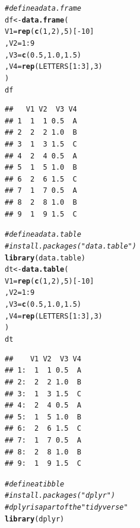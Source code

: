 \documentclass[11pt]{article}\usepackage[]{graphicx}\usepackage[]{color}
\makeatletter
\newcommand{\hlnum}[1]{\textcolor[rgb]{0.686,0.059,0.569}{#1}}%
\newcommand{\hlcom}[1]{\textcolor[rgb]{0.678,0.584,0.686}{\textit{#1}}}%
\newcommand{\hlopt}[1]{\textcolor[rgb]{0,0,0}{#1}}%
\newcommand{\hlstd}[1]{\textcolor[rgb]{0.345,0.345,0.345}{#1}}%
\newcommand{\hlkwb}[1]{\textcolor[rgb]{0.69,0.353,0.396}{#1}}%
\newcommand{\hlkwc}[1]{\textcolor[rgb]{0.333,0.667,0.333}{#1}}%
\newcommand{\hlkwd}[1]{\textcolor[rgb]{0.737,0.353,0.396}{\textbf{#1}}}%
\newenvironment{kframe}{%
 \def\at@end@of@kframe{}%
 \ifinner\ifhmode%
  \def\at@end@of@kframe{\end{minipage}}%
  \begin{minipage}{\columnwidth}%
 \fi\fi%
 \def\FrameCommand##1{\hskip\@totalleftmargin \hskip-\fboxsep
 \colorbox{shadecolor}{##1}\hskip-\fboxsep
     \hskip-\linewidth \hskip-\@totalleftmargin \hskip\columnwidth}%
 \MakeFramed {\advance\hsize-\width
   \@totalleftmargin\z@ \linewidth\hsize
   \@setminipage}}%
 {\par\unskip\endMakeFramed%
 \at@end@of@kframe}
\newenvironment{knitrout}{}{} %
\makeatother
\begin{document}
\begin{knitrout}
\color{fgcolor}\begin{kframe}
\begin{alltt}
\hlcom{# define a data.frame}
\hlstd{df} \hlkwb{<-} \hlkwd{data.frame}\hlstd{(}
          \hlkwc{V1} \hlstd{=} \hlkwd{rep}\hlstd{(}\hlkwd{c}\hlstd{(}\hlnum{1}\hlstd{,} \hlnum{2}\hlstd{),} \hlnum{5}\hlstd{)[}\hlopt{-}\hlnum{10}\hlstd{]}
        \hlstd{,} \hlkwc{V2} \hlstd{=} \hlnum{1}\hlopt{:}\hlnum{9}
        \hlstd{,} \hlkwc{V3} \hlstd{=} \hlkwd{c}\hlstd{(}\hlnum{0.5}\hlstd{,} \hlnum{1.0}\hlstd{,} \hlnum{1.5}\hlstd{)}
        \hlstd{,} \hlkwc{V4} \hlstd{=} \hlkwd{rep}\hlstd{(LETTERS[}\hlnum{1}\hlopt{:}\hlnum{3}\hlstd{],} \hlnum{3}\hlstd{)}
        \hlstd{)}
\hlstd{df}
\end{alltt}
\begin{verbatim}
##   V1 V2  V3 V4
## 1  1  1 0.5  A
## 2  2  2 1.0  B
## 3  1  3 1.5  C
## 4  2  4 0.5  A
## 5  1  5 1.0  B
## 6  2  6 1.5  C
## 7  1  7 0.5  A
## 8  2  8 1.0  B
## 9  1  9 1.5  C
\end{verbatim}
\begin{alltt}
\hlcom{# define a data.table}
\hlcom{# install.packages("data.table")}
\hlkwd{library}\hlstd{(data.table)}
\hlstd{dt} \hlkwb{<-} \hlkwd{data.table}\hlstd{(}
          \hlkwc{V1} \hlstd{=} \hlkwd{rep}\hlstd{(}\hlkwd{c}\hlstd{(}\hlnum{1}\hlstd{,} \hlnum{2}\hlstd{),} \hlnum{5}\hlstd{)[}\hlopt{-}\hlnum{10}\hlstd{]}
        \hlstd{,} \hlkwc{V2} \hlstd{=} \hlnum{1}\hlopt{:}\hlnum{9}
        \hlstd{,} \hlkwc{V3} \hlstd{=} \hlkwd{c}\hlstd{(}\hlnum{0.5}\hlstd{,} \hlnum{1.0}\hlstd{,} \hlnum{1.5}\hlstd{)}
        \hlstd{,} \hlkwc{V4} \hlstd{=} \hlkwd{rep}\hlstd{(LETTERS[}\hlnum{1}\hlopt{:}\hlnum{3}\hlstd{],} \hlnum{3}\hlstd{)}
        \hlstd{)}
\hlstd{dt}
\end{alltt}
\begin{verbatim}
##    V1 V2  V3 V4
## 1:  1  1 0.5  A
## 2:  2  2 1.0  B
## 3:  1  3 1.5  C
## 4:  2  4 0.5  A
## 5:  1  5 1.0  B
## 6:  2  6 1.5  C
## 7:  1  7 0.5  A
## 8:  2  8 1.0  B
## 9:  1  9 1.5  C
\end{verbatim}
\begin{alltt}
\hlcom{# define a tibble}
\hlcom{# install.packages("dplyr")}
\hlcom{# dplyr is a part of the "tidyverse"}
\hlkwd{library}\hlstd{(dplyr)}
\end{alltt}


{\ttfamily\noindent\itshape\color{messagecolor}{\#\# \\\#\# Attaching package: 'dplyr'}}


\end{kframe}
\end{knitrout}
\end{document}
